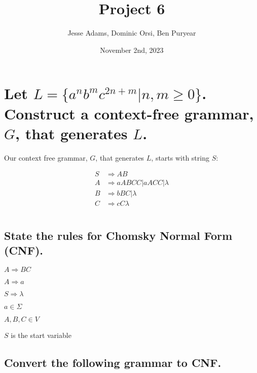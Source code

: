 \documentclass{article}
\title{Project 6}
\author{Jesse Adams, Dominic Orsi, Ben Puryear}
\date{November 2nd, 2023}
\begin{document}
\maketitle

\section{ Let $L = \{a^n b^m c^{2n+m} | n, m \ge 0\}$.  Construct a context-free grammar, $G$, that generates $L$.}

Our context free grammar, $G$, that generates $L$, starts with string $S$:

\begin{align*}
    S & \Rightarrow A B                           \\
    A & \Rightarrow a A B C C | a A C C | \lambda \\
    B & \Rightarrow b B C | \lambda               \\
    C & \Rightarrow c C \lambda
\end{align*}

\pagebreak

\section{}

\subsection{State the rules for Chomsky Normal Form (CNF).}

\begin{list}{}{A CFG is in CNF if every rule is of the form:}
    \item $A \Rightarrow BC$
    \item $A \Rightarrow a$
    \item $S \Rightarrow \lambda$
\end{list}

\begin{list}{}{Where:}
    \item $a \in \Sigma$
    \item $A, B, C \in V$
    \item $S$ is the start variable
\end{list}

\subsection{Convert the following grammar to CNF.}
\end{document}

